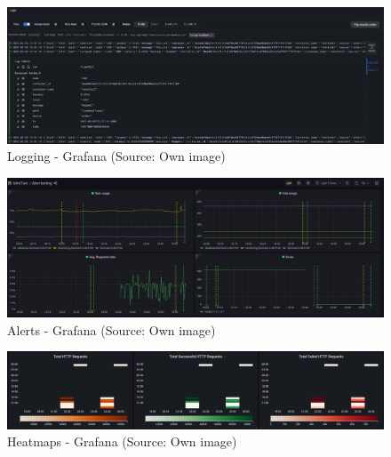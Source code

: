 \begin{figure}[H]
    \centering
    \includegraphics[width = \linewidth]{images/monitoring/logging_1.png}
    \caption{Logging - Grafana (Source: Own image)}
\end{figure}

\begin{figure}[H]
    \centering
    \includegraphics[width = \linewidth]{images/monitoring/Grafana_Alerts.png}
    \caption{Alerts - Grafana (Source: Own image)}
\end{figure}

\begin{figure}[H]
    \centering
    \includegraphics[width = \linewidth]{images/monitoring/Grafana_Heatmaps.png}
    \caption{Heatmaps - Grafana (Source: Own image)}
\end{figure}